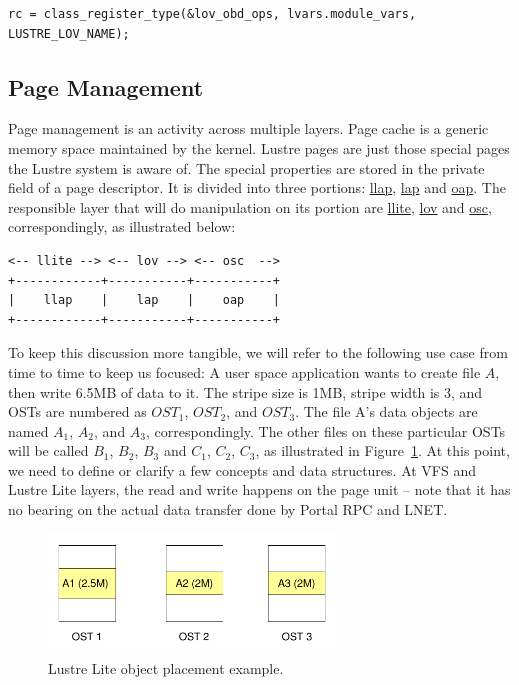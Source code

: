 \begin{Verbatim}
rc = class_register_type(&lov_obd_ops, lvars.module_vars, LUSTRE_LOV_NAME);
\end{Verbatim}

\subsection{Page Management}

Page management is an activity across multiple layers.  Page cache is a
generic memory space maintained by the kernel.  Lustre pages are just those
special pages the Lustre system is aware of. The special properties are stored in
the private field of a page descriptor.  It is divided into three portions:
\url{llap}, \url{lap} and \url{oap}. The responsible layer that will do
manipulation on its portion are \url{llite}, \url{lov} and \url{osc},
correspondingly, as illustrated below:

\begin{Verbatim}   
<-- llite --> <-- lov --> <-- osc  --> 
+------------+-----------+-----------+
|    llap    |    lap    |    oap    |
+------------+-----------+-----------+
\end{Verbatim}

To keep this discussion more tangible, we will refer to the following use case
from time to time to keep us focused: A user space application wants to create
file $A$, then write 6.5MB of data to it. The stripe size is 1MB, stripe width
is 3, and OSTs are numbered as $OST_1$, $OST_2$, and $OST_3$. The file A's data
objects are named $A_1$, $A_2$, and $A_3$, correspondingly.  The other files
on these particular OSTs will be called $B_1$, $B_2$, $B_3$ and $C_1$, $C_2$,
$C_3$, as illustrated in Figure~\ref{fig:lite_example}.  At this point, we need
to define or clarify a few concepts and data structures.  At VFS and Lustre
Lite layers, the read and write happens on the page unit -- note that it has no
bearing on the actual data transfer done by Portal RPC and LNET. 
 
\begin{figure}[hbt]
\centering
\includegraphics[width=3in]{img/lite_example}
\caption{Lustre Lite object placement example.}
\label{fig:lite_example}
\end{figure}

